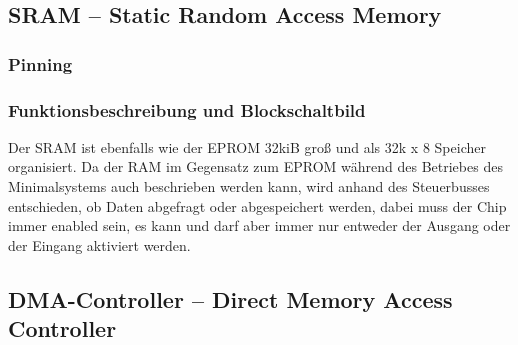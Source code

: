 \subsection{SRAM -- Static Random Access Memory}
\subsubsection{Pinning}

\subsubsection{Funktionsbeschreibung und Blockschaltbild}
Der SRAM ist ebenfalls wie der EPROM 32kiB groß und als 32k x 8 Speicher organisiert. Da der RAM im Gegensatz zum EPROM während des Betriebes des Minimalsystems auch beschrieben werden kann, wird anhand des Steuerbusses entschieden, ob Daten abgefragt oder abgespeichert werden, dabei muss der Chip immer enabled sein, es kann und darf aber immer nur entweder der Ausgang oder der Eingang aktiviert werden.

\subsection{DMA-Controller -- Direct Memory Access Controller}
